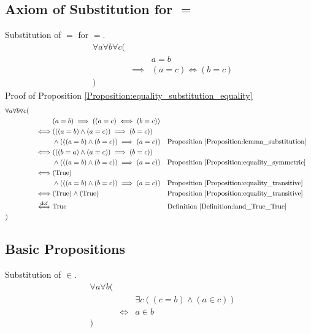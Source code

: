 \subsection{Axiom of Substitution for $=$}
\begin{prop}
\label{Proposition:equality_substitution_equality}
Substitution of $=$ for $=$.
\begin{align*}
& \forall a \forall b \forall c ( \\
& & & a = b \\
& & \implies & (a = c) \iff (b = c) \\
& )
\end{align*}
Proof of Proposition \ref{Proposition:equality_substitution_equality}
\begin{align*}
& \forall a \forall b \forall c ( \\
& & & (a = b) \implies ((a = c) \iff (b = c)) \\
& & \iff & (((a = b) \land (a = c)) \implies (b = c)) \\
& & & \land (((a = b) \land (b = c)) \implies (a = c))
& & \text{Proposition \ref{Proposition:lemma_substitution}} \\
& & \iff & (((b = a) \land (a = c)) \implies (b = c)) \\
& & & \land (((a = b) \land (b = c)) \implies (a = c))
& & \text{Proposition \ref{Proposition:equality_symmetric}} \\
& & \iff & (\text{True}) \\
& & & \land (((a = b) \land (b = c)) \implies (a = c))
& & \text{Proposition \ref{Proposition:equality_transitive}} \\
& & \iff & (\text{True}) \land (\text{True})
& & \text{Proposition \ref{Proposition:equality_transitive}} \\
& & \overset{\operatorname{def}}{\iff} & \text{True}
& & \text{Definition \ref{Definition:land_True_True}} \\
& )
\end{align*}
\end{prop}

\subsection{Basic Propositions}
\begin{axm}
\label{Axiom:substitution_in}
Substitution of $\in$.
\begin{align*}
& \forall a \forall b ( \\
& & & \exists c ((c = b) \land (a \in c)) \\
& & \iff & a \in b \\
& )
\end{align*}
\end{axm}

